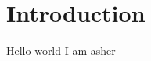 \documentclass[../main]{subfiles}
\begin{document}
\section{Introduction}

Hello world I am asher
\end{document}
